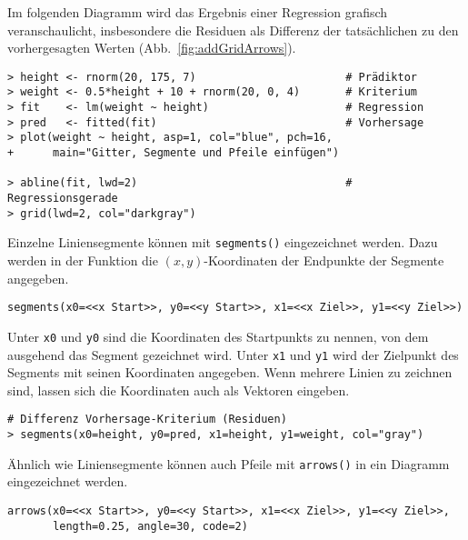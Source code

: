 Im folgenden Diagramm wird das Ergebnis einer Regression grafisch veranschaulicht, insbesondere die Residuen als Differenz der tatsächlichen zu den vorhergesagten Werten (Abb.\ \ref{fig:addGridArrows}).
\begin{lstlisting}
> height <- rnorm(20, 175, 7)                       # Prädiktor
> weight <- 0.5*height + 10 + rnorm(20, 0, 4)       # Kriterium
> fit    <- lm(weight ~ height)                     # Regression
> pred   <- fitted(fit)                             # Vorhersage
> plot(weight ~ height, asp=1, col="blue", pch=16,
+      main="Gitter, Segmente und Pfeile einfügen")

> abline(fit, lwd=2)                                # Regressionsgerade
> grid(lwd=2, col="darkgray")
\end{lstlisting}

Einzelne Liniensegmente können mit \lstinline!segments()! eingezeichnet werden. Dazu werden in der Funktion die $(x, y)$-Koordinaten der Endpunkte der Segmente angegeben.
\begin{lstlisting}
segments(x0=<<x Start>>, y0=<<y Start>>, x1=<<x Ziel>>, y1=<<y Ziel>>)
\end{lstlisting}

Unter \lstinline!x0! und \lstinline!y0! sind die Koordinaten des Startpunkts zu nennen, von dem ausgehend das Segment gezeichnet wird. Unter \lstinline!x1! und \lstinline!y1! wird der Zielpunkt des Segments mit seinen Koordinaten angegeben. Wenn mehrere Linien zu zeichnen sind, lassen sich die Koordinaten auch als Vektoren eingeben.
\begin{lstlisting}
# Differenz Vorhersage-Kriterium (Residuen)
> segments(x0=height, y0=pred, x1=height, y1=weight, col="gray")
\end{lstlisting}

Ähnlich wie Liniensegmente können auch Pfeile mit \lstinline!arrows()! in ein Diagramm eingezeichnet werden.
\begin{lstlisting}
arrows(x0=<<x Start>>, y0=<<y Start>>, x1=<<x Ziel>>, y1=<<y Ziel>>,
       length=0.25, angle=30, code=2)
\end{lstlisting}

